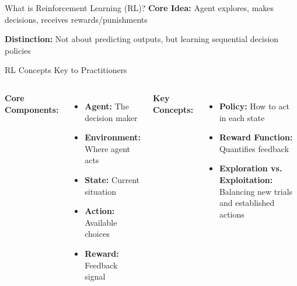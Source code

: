\documentclass[aspectratio=169]{beamer}
\begin{document}
\begin{frame}{What is Reinforcement Learning (RL)?}
  \textbf{Core Idea:} Agent explores, makes decisions, receives
  rewards/punishments

  \vspace{0.5cm}
  \begin{center}
  \end{center}

  \vspace{0.5cm}
  \textbf{Distinction:} Not about predicting outputs, but learning
  sequential decision policies
\end{frame}

\begin{frame}{RL Concepts Key to Practitioners}
  \begin{columns}
    \textbf{Core Components:}
    \begin{itemize}
      \item \textbf{Agent:} The decision maker
      \item \textbf{Environment:} Where agent acts
      \item \textbf{State:} Current situation
      \item \textbf{Action:} Available choices
      \item \textbf{Reward:} Feedback signal
    \end{itemize}

    \textbf{Key Concepts:}
    \begin{itemize}
      \item \textbf{Policy:} How to act in each state
      \item \textbf{Reward Function:} Quantifies feedback
      \item \textbf{Exploration vs. Exploitation:} Balancing new
        trials and established actions
    \end{itemize}
  \end{columns}
\end{frame}
\end{document}
